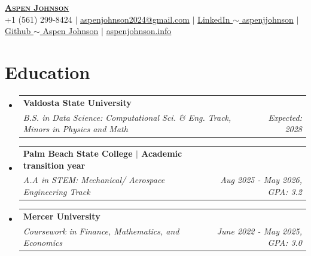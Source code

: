 \documentclass[letterpaper,11.000000001 pt]{article}
\makeatletter
\newcommand{\resumeEducationEntry}[3]{
  \vspace{-2pt}\item
    \begin{tabular*}{0.97\textwidth}[t]{l@{\extracolsep{\fill}}r}
      \textbf{#1} & \\
      \textit{\small#2} & \textit{\small #3} \hfill
    \end{tabular*}\vspace{-4pt}
}
\newcommand{\resumeSubHeadingListStart}{\begin{itemize}[leftmargin=0.15in, label={}]}
\newcommand{\resumeSubHeadingListEnd}{\end{itemize}}
\makeatother
\begin{document}

\begin{center}
    \textbf{\Huge \scshape \underline{Aspen Johnson}} \\ \vspace{5pt}
    \small +1 (561) 299-8424 $|$ \href{mailto:aspenjohnson2024@gmail.com}{aspenjohnson2024@gmail.com} $|$
    \href{https://www.linkedin.com/in/aspenjjohnson/}{LinkedIn $\sim$ aspenjjohnson} $|$
    \href{https://github.com/aspenjjohnson}{Github $\sim$ Aspen Johnson} $|$
    \href{https://www.aspenjohnson.info}{aspenjohnson.info}
\end{center}


\section{Education}
  \resumeSubHeadingListStart
    \resumeEducationEntry
      {Valdosta State University}
      {B.S. in Data Science: Computational Sci. \& Eng. Track, Minors in Physics and Math}
      {Expected: 2028}

    \resumeEducationEntry
      {Palm Beach State College $|$ Academic transition year }
      {A.A in STEM: Mechanical/ Aerospace Engineering Track}
      {Aug 2025 - May 2026, GPA: 3.2}
    
    \resumeEducationEntry
      {Mercer University }
      {Coursework in Finance, Mathematics, and Economics}
      {June 2022 - May 2025, GPA: 3.0}
      
  \resumeSubHeadingListEnd
  


\end{document}

